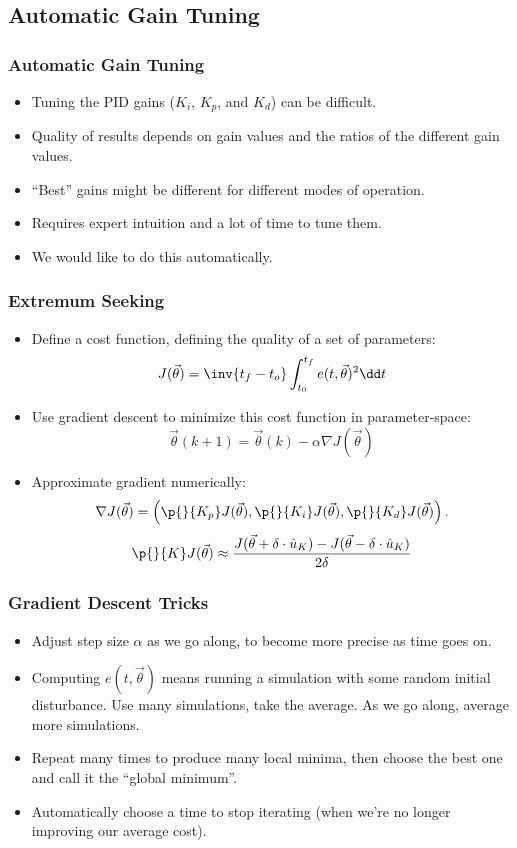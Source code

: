 \documentclass{beamer}
\begin{document}
\subsection{Automatic Gain Tuning}
\begin{frame}
    \frametitle{Automatic Gain Tuning}
    \begin{itemize}
        \item Tuning the PID gains ($K_i$, $K_p$, and $K_d$) can be difficult.
        \item Quality of results depends on gain values and the ratios of the different gain values.
        \item ``Best'' gains might be different for different modes of operation.
        \item Requires expert intuition and a lot of time to tune them.
        \item We would like to do this automatically.
    \end{itemize}
\end{frame}

\begin{frame}
    \frametitle{Extremum Seeking}
    \begin{itemize}
        \item Define a cost function, defining the quality of a set of parameters:
            \[J(\vec\theta) = \inv{t_f - t_o} \int_{t_0}^{t_f} e(t, \vec\theta)^2 \dd t\]
        \item Use gradient descent to minimize this cost function in parameter-space:
            \[\vec\theta(k + 1) = \vec\theta(k) - \alpha \nabla J(\vec \theta)\]
        \item Approximate gradient numerically:
            \[\nabla J(\vec\theta) = \left(\p{ }{K_p} J(\vec\theta), \p{ }{K_i} J(\vec\theta), \p{ }{K_d} J(\vec\theta)\right).\]
            \[\p{ }{K} J(\vec\theta) \approx \frac{J(\vec\theta + \delta\cdot \hat{u}_K) - J(\vec\theta- \delta\cdot \hat{u}_K)}{2\delta}\] 
    \end{itemize}
\end{frame}

\begin{frame}
    \frametitle{Gradient Descent Tricks}
    \begin{itemize}
        \item Adjust step size $\alpha$ as we go along, to become more precise as time goes on.
        \item Computing $e(t, \vec\theta)$ means running a simulation with some random initial
            disturbance. Use many simulations, take the average. As we go along, average more
            simulations.
        \item Repeat many times to produce many local minima, then choose the best one and call it
            the ``global minimum''.
        \item Automatically choose a time to stop iterating (when we're no longer improving our
            average cost).
    \end{itemize}
\end{frame}
\end{document}
